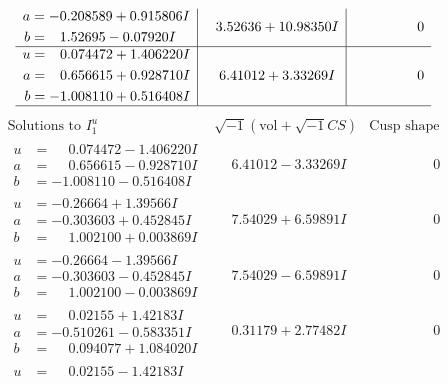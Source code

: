 \documentclass[1p]{elsarticle_modified}
\theoremstyle{definition}
\newcommand{\I}{\sqrt{-1}}
\begin{document}
$$\begin{array}{c|c|c}
\begin{aligned}
a &= -0.208589 + 0.915806 I \\
b &= \phantom{-}1.52695 - 0.07920 I\end{aligned}
 & \phantom{-}3.52636 + 10.98350 I & \phantom{-0.000000 } 0 \\ \hline\begin{aligned}
u &= \phantom{-}0.074472 + 1.406220 I \\
a &= \phantom{-}0.656615 + 0.928710 I \\
b &= -1.008110 + 0.516408 I\end{aligned}
 & \phantom{-}6.41012 + 3.33269 I & \phantom{-0.000000 } 0\\
 \hline 
 \end{array}$$\newpage$$\begin{array}{c|c|c}  
\text{Solutions to }I^u_{1}& \I (\text{vol} + \sqrt{-1}CS) & \text{Cusp shape}\\
 \hline 
\begin{aligned}
u &= \phantom{-}0.074472 - 1.406220 I \\
a &= \phantom{-}0.656615 - 0.928710 I \\
b &= -1.008110 - 0.516408 I\end{aligned}
 & \phantom{-}6.41012 - 3.33269 I & \phantom{-0.000000 } 0 \\ \hline\begin{aligned}
u &= -0.26664 + 1.39566 I \\
a &= -0.303603 + 0.452845 I \\
b &= \phantom{-}1.002100 + 0.003869 I\end{aligned}
 & \phantom{-}7.54029 + 6.59891 I & \phantom{-0.000000 } 0 \\ \hline\begin{aligned}
u &= -0.26664 - 1.39566 I \\
a &= -0.303603 - 0.452845 I \\
b &= \phantom{-}1.002100 - 0.003869 I\end{aligned}
 & \phantom{-}7.54029 - 6.59891 I & \phantom{-0.000000 } 0 \\ \hline\begin{aligned}
u &= \phantom{-}0.02155 + 1.42183 I \\
a &= -0.510261 - 0.583351 I \\
b &= \phantom{-}0.094077 + 1.084020 I\end{aligned}
 & \phantom{-}0.31179 + 2.77482 I & \phantom{-0.000000 } 0 \\ \hline\begin{aligned}
u &= \phantom{-}0.02155 - 1.42183 I \\

\end{aligned}
\end{array}$$
\end{document}
